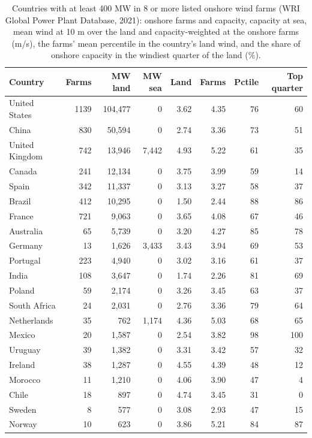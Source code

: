 \documentclass[11pt,a4paper]{article}
\begin{document}
\begin{table}[tbp]\centering\small\caption{Countries with at least 400 MW in 8 or more listed onshore wind farms (WRI Global Power Plant Database, 2021): onshore farms and capacity, capacity at sea, mean wind at 10 m over the land and capacity-weighted at the onshore farms (m/s), the farms' mean percentile in the country's land wind, and the share of onshore capacity in the windiest quarter of the land (\%).}\label{tab:farms}\begin{tabular}{lrrrrrrr}\toprule Country & Farms & MW land & MW sea & Land & Farms & Pctile & Top quarter\\\midrule
United States & 1139 & 104,477 & 0 & 3.62 & 4.35 & 76 & 60\\
China & 830 & 50,594 & 0 & 2.74 & 3.36 & 73 & 51\\
United Kingdom & 742 & 13,946 & 7,442 & 4.93 & 5.22 & 61 & 35\\
Canada & 241 & 12,134 & 0 & 3.75 & 3.99 & 59 & 14\\
Spain & 342 & 11,337 & 0 & 3.13 & 3.27 & 58 & 37\\
Brazil & 412 & 10,295 & 0 & 1.50 & 2.44 & 88 & 86\\
France & 721 & 9,063 & 0 & 3.65 & 4.08 & 67 & 46\\
Australia & 65 & 5,739 & 0 & 3.20 & 4.27 & 85 & 78\\
Germany & 13 & 1,626 & 3,433 & 3.43 & 3.94 & 69 & 53\\
Portugal & 223 & 4,940 & 0 & 3.02 & 3.16 & 61 & 37\\
India & 108 & 3,647 & 0 & 1.74 & 2.26 & 81 & 69\\
Poland & 59 & 2,174 & 0 & 3.26 & 3.45 & 63 & 37\\
South Africa & 24 & 2,031 & 0 & 2.76 & 3.36 & 79 & 64\\
Netherlands & 35 & 762 & 1,174 & 4.36 & 5.03 & 68 & 65\\
Mexico & 20 & 1,587 & 0 & 2.54 & 3.82 & 98 & 100\\
Uruguay & 39 & 1,382 & 0 & 3.31 & 3.42 & 57 & 32\\
Ireland & 38 & 1,287 & 0 & 4.55 & 4.39 & 48 & 12\\
Morocco & 11 & 1,210 & 0 & 4.06 & 3.90 & 47 & 4\\
Chile & 18 & 897 & 0 & 4.74 & 3.45 & 31 & 0\\
Sweden & 8 & 577 & 0 & 3.08 & 2.93 & 47 & 15\\
Norway & 10 & 623 & 0 & 3.86 & 5.21 & 84 & 87\\
\bottomrule\end{tabular}\end{table}
\end{document}
